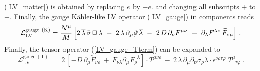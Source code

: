\documentclass[12pt]{revtex4}
\newcommand{\slashed}[1]{\hbox{{$#1$}\llap{$/$}}}
\begin{document}
(\ref{LV_matter}) is obtained by replacing $e$ by $-e$.   and changing
all subscripts $+$ to $-$.  Finally, the gauge K\"ahler-like LV operator
(\ref{LV_gauge}) in components reads 
\begin{equation}
\label{LV_gauge_comp}
\mathcal{L}_{\mathrm{LV}}^{\mathrm{gauge\ (K)}} =  
\frac {N^\mu}{M} \, 
\Big[
2\, \overline{\lambda}\,\bar \sigma\, \Box\, 
   \lambda 
~+~
2\, \lambda\, \partial_\mu \slashed{\partial}\, 
   \overline{\lambda} 
~-~ 
2\, D\, \partial_\nu F^{\mu\nu}
~+~ 
\partial_\lambda F^{\lambda\nu}\, 
\widetilde{F}_{\nu\mu}  
\Big]~.
\end{equation}
Finally, the tensor operator (\ref{LV_gauge_Tterm}) can be expanded to
\begin{equation}
\label{LV_gauge_Tterm_comp}
\mathcal{L}_{\mathrm{LV}}^{\mathrm{gauge\ (T)}}  ~=~ 
2\,
\left[
   - D\, \partial_\mu \widetilde{F}_{\nu\rho} 
   ~+~
   F_{\nu\lambda}\partial_\mu F_\rho^{\phantom{\rho}\lambda}
\right] 
\cdot
	T^{\mu\nu\rho}
	~-~
	2\,
    	\overline{\lambda}\, \partial_\mu \partial_\nu
    	\overline{\sigma}_\rho \lambda
	\cdot
   	\epsilon^{\nu\rho\tau\varphi}
	\;
   	T^\mu_{\phantom{\mu}\tau\varphi}
	~.
\end{equation}
\end{document}
